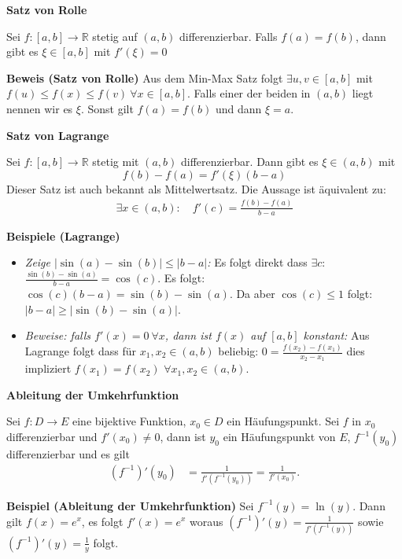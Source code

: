 \documentclass[25pt]{sciposter}
\newcommand{\R}{\mathbb{R}}
\newenvironment{method}[1]{\begin{mdframed}[backgroundcolor=blue!10,innertopmargin=15pt, innerbottommargin=15pt, nobreak=true]
		\textbf{#1 }
	}
	{ 
	\end{mdframed}
}
\begin{document}
\begin{multicols}{3}
\begin{method}{Satz von Rolle}
	Sei $f: [a,b] \to \R$ stetig auf $(a,b)$ differenzierbar. Falls $f(a) = f(b)$, dann gibt es $\xi \in [a,b]$ mit $f'(\xi) = 0$
\end{method}
\textbf{Beweis (Satz von Rolle)} Aus dem Min-Max Satz folgt $\exists u,v \in [a,b]$ mit $f(u) \leq f(x) \leq f(v) \ \forall x \in [a,b]$. Falls einer der beiden in $(a,b)$ liegt nennen wir es $\xi$. Sonst gilt $f(a) = f(b)$ und dann $\xi = a$.


\begin{method}{Satz von Lagrange}
	Sei $f:[a,b] \to \R$ stetig mit $(a,b)$ differenzierbar. Dann gibt es $\xi \in (a,b)$ mit $$f(b) - f(a) = f'(\xi) (b-a)$$
	Dieser Satz ist auch bekannt als Mittelwertsatz. Die Aussage ist äquivalent zu: 
	\begin{align*}
		\exists x \in (a,b) : \quad f'(c) = \frac{f(b) -f(a) }{b-a}
	\end{align*}
\end{method}
\textbf{Beispiele (Lagrange)}
\begin{itemize}
	\item \textit{Zeige $|\sin(a) - \sin(b)| \leq |b-a|$:} Es folgt direkt dass $\exists c$: $\frac{\sin(b)- \sin(a)}{b-a} = \cos(c)$. Es folgt: $\cos(c) (b-a) = \sin(b) - \sin(a)$. Da aber $\cos(c) \leq 1$ folgt:
	$|b-a| \geq |\sin(b) - \sin(a)|$.
	\item \textit{Beweise: falls $f'(x) = 0 \ \forall x$, dann ist $f(x)$ auf $[a,b]$ konstant:} Aus Lagrange folgt dass für $x_1,x_2\in (a,b)$ beliebig: $0 = \frac{f(x_2)-f(x_1)}{x_2-x_1}$ dies impliziert $f(x_1) = f(x_2)$ $\forall x_1,x_2 \in (a,b)$.
\end{itemize}


\begin{method}{Ableitung der Umkehrfunktion}
	Sei $f: D \to E$ eine bijektive Funktion, $x_0 \in D$ ein Häufungspunkt. Sei $f$ in $x_0$ differenzierbar und $f'(x_0) \not = 0$, dann ist $y_0$ ein Häufungspunkt von $E$, $f^{-1}(y_0)$ differenzierbar und es gilt
	\begin{align*}
		(f^{{-1}})'(y_0) &= {\frac  {1}{f'(f^{{-1}}(y_0))}}={\frac  {1}{f'(x_0)}}.
	\end{align*}
\end{method}
\textbf{Beispiel (Ableitung der Umkehrfunktion)} Sei $f^{-1}(y) = \ln(y)$. Dann gilt $f(x) = e^x$, es folgt $f'(x)= e^x$ woraus $(f^{-1})'(y) = \frac{1}{f'(f^{-1}(y))}$ sowie $(f^{-1})'(y) = \frac{1}{y}$ folgt. 


\end{multicols}
\end{document}
